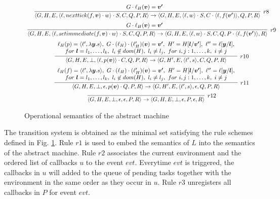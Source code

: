 \begin{figure}[t]
{$$\begin{array}{c}
\infer [r8]
{\tuple{G,H,E,\tuple{\ell,nexttick(f,\vec{v})\cdot w}\cdot S,C,Q,P,R}\rightarrow
 \tuple{G,H,E,\tuple{\ell,w}\cdot S,C\cdot \tuple{\ell,f(\vec{v'})},Q,P,R}}
{G\cdot\ell_H(\vec{v})=\vec{v'} &}
\medskip\\
\infer[r9]{
\tuple{G,H,E,\tuple{\ell,setimmediate(f,\vec{v})\cdot w}\cdot S,C,Q,P,R}\rightarrow
\tuple{G,H,E,\tuple{\ell,w}\cdot S,C,Q,P\cdot \tuple{\ell,f(\vec{v'})},R}}
			       {G\cdot\ell_H(\vec{v})=\vec{v'} &}
\medskip\\
\infer[r10]{
\tuple{G,H,E,\bot,\tuple{\ell,p(\vec{v})}\cdot C,Q,P,R}\rightarrow
\tuple{G,H',E,\tuple{\ell',s},C,Q,P,R}}
{
\begin{array}{c}
\ell_H(p)=\tuple{\ell',\lambda\vec{y}.s},\ G\cdot (\ell_H)\cdot(\ell'_H)(\vec{v})=\vec{v'},\ 
H'=H[\vec{l}/\vec{v'}],\ \ell''=\ell[\vec{y}/\vec{l}],\\ 
for\ \vec{l}=l_1,\ldots,l_k,\ 
l_i\not\in dom(H),\ l_i\neq l_j,\  for\ i,j:1,\ldots,k,\ i\neq j
\end{array}
}
\medskip\\
\infer[r11]{
\tuple{G,H,E,\bot,\epsilon,p(\vec{v})\cdot Q,P,R}\rightarrow
\tuple{G,H',E,\tuple{\ell',s},\epsilon,Q,P,R}}
{
\begin{array}{c}
\ell_H(f)=\tuple{\ell',\lambda\vec{y}.s},\ G\cdot (\ell_H)\cdot(\ell'_H)(\vec{v})=\vec{v'},\ 
H'=H[\vec{l}/\vec{v'}],\ \ell''=\ell[\vec{y}/\vec{l}],\\ 
for\ \vec{l}=l_1,\ldots,l_k,\ 
l_i\not\in dom(H),\ l_i\neq l_j,\  for\ i,j:1,\ldots,k,\ i\neq j
\end{array}
}
\medskip\\
\infer[r12]{
\tuple{G,H,E,\bot,\epsilon,\epsilon,P,R}\rightarrow
\tuple{G,H,E,\bot,\epsilon,P,\epsilon,R}}
      {}
\end{array}
$$
}
\caption{Operational semantics of the abstract machine}
\label{opsem}
\end{figure}
%
The transition system is obtained as the minimal set satisfying the rule schemes defined 
in Fig. \ref{opsem}.
Rule $r1$ is used to embed the semantics of $L$ into the semantics of the abstract machine.
Rule $r2$ associates the current environment and the ordered list of callbacks $u$ to the event $evt$. 
Everytime $evt$ is triggered, the callbacks in $u$ will added to the queue of pending tasks together with the environment in the same order as they occur in $u$.
Rule $r3$ unregisters all callbacks in $P$ for event $evt$.
